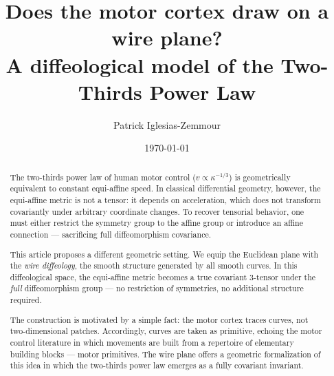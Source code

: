 \documentclass[10pt,letterpaper,reqno]{amsart}
\title[Does the motor cortex draw on a wire plane?]{Does the motor cortex draw on a wire plane? \\
\small A diffeological model of the Two-Thirds Power Law}
\author{Patrick Iglesias-Zemmour}
\date{\today}
\begin{document}
  
  
  
  
  \begin{abstract}
    The two-thirds power law of human motor control ($v \propto \kappa^{-1/3}$)
    is geometrically equivalent to constant equi-affine speed.
    In classical differential geometry, however, the equi-affine metric is not a tensor:
    it depends on acceleration, which does not transform covariantly
    under arbitrary coordinate changes.
    To recover tensorial behavior, one must either restrict the symmetry group
    to the affine group or introduce an affine connection ---
    sacrificing full diffeomorphism covariance.
    
    \noindent This article proposes a different geometric setting.
    We equip the Euclidean plane with the \emph{wire diffeology},
    the smooth structure generated by all smooth curves.
    In this diffeological space, the equi-affine metric becomes
    a true covariant $3$-tensor under the \emph{full} diffeomorphism group ---
    no restriction of symmetries, no additional structure required.
    
    \noindent The construction is motivated by a simple fact:
    the motor cortex traces curves, not two-dimensional patches.
    Accordingly, curves are taken as primitive,
    echoing the motor control literature in which movements are built
    from a repertoire of elementary building blocks --- motor primitives.
    The wire plane offers a geometric formalization of this idea
    in which the two-thirds power law emerges as a fully covariant invariant.
  \end{abstract}
  
  
  \maketitle
  
\end{document}
